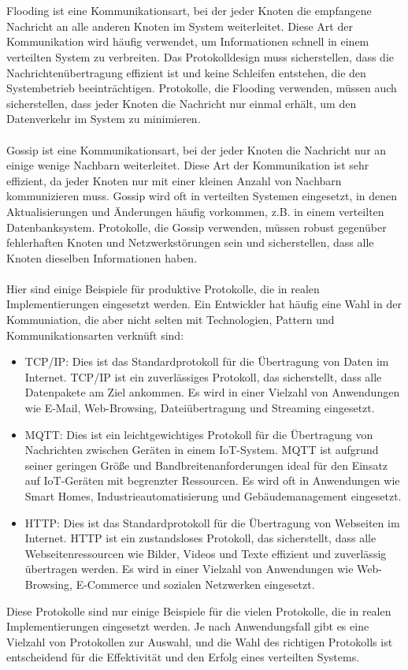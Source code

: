 \\\\
Flooding ist eine Kommunikationsart, bei der jeder Knoten die empfangene Nachricht an alle anderen Knoten im System weiterleitet. Diese Art der Kommunikation wird häufig verwendet, um Informationen schnell in einem verteilten System zu verbreiten. Das Protokolldesign muss sicherstellen, dass die Nachrichtenübertragung effizient ist und keine Schleifen entstehen, die den Systembetrieb beeinträchtigen. Protokolle, die Flooding verwenden, müssen auch sicherstellen, dass jeder Knoten die Nachricht nur einmal erhält, um den Datenverkehr im System zu minimieren.
\\\\
Gossip ist eine Kommunikationsart, bei der jeder Knoten die Nachricht nur an einige wenige Nachbarn weiterleitet. Diese Art der Kommunikation ist sehr effizient, da jeder Knoten nur mit einer kleinen Anzahl von Nachbarn kommunizieren muss. Gossip wird oft in verteilten Systemen eingesetzt, in denen Aktualisierungen und Änderungen häufig vorkommen, z.B. in einem verteilten Datenbanksystem. Protokolle, die Gossip verwenden, müssen robust gegenüber fehlerhaften Knoten und Netzwerkstörungen sein und sicherstellen, dass alle Knoten dieselben Informationen haben.
\\\\
Hier sind einige Beispiele für produktive Protokolle, die in realen Implementierungen eingesetzt werden. Ein Entwickler hat häufig eine Wahl in der Kommuniation, die aber nicht selten mit Technologien, Pattern und Kommunikationsarten verknüft sind:
 \begin{itemize}
\item TCP/IP: Dies ist das Standardprotokoll für die Übertragung von Daten im Internet. TCP/IP ist ein zuverlässiges Protokoll, das sicherstellt, dass alle Datenpakete am Ziel ankommen. Es wird in einer Vielzahl von Anwendungen wie E-Mail, Web-Browsing, Dateiübertragung und Streaming eingesetzt.

\item  MQTT: Dies ist ein leichtgewichtiges Protokoll für die Übertragung von Nachrichten zwischen Geräten in einem IoT-System. MQTT ist aufgrund seiner geringen Größe und Bandbreitenanforderungen ideal für den Einsatz auf IoT-Geräten mit begrenzter Ressourcen. Es wird oft in Anwendungen wie Smart Homes, Industrieautomatisierung und Gebäudemanagement eingesetzt.

\item HTTP: Dies ist das Standardprotokoll für die Übertragung von Webseiten im Internet. HTTP ist ein zustandsloses Protokoll, das sicherstellt, dass alle Webseitenressourcen wie Bilder, Videos und Texte effizient und zuverlässig übertragen werden. Es wird in einer Vielzahl von Anwendungen wie Web-Browsing, E-Commerce und sozialen Netzwerken eingesetzt.
 \end{itemize}
Diese Protokolle sind nur einige Beispiele für die vielen Protokolle, die in realen Implementierungen eingesetzt werden. Je nach Anwendungsfall gibt es eine Vielzahl von Protokollen zur Auswahl, und die Wahl des richtigen Protokolls ist entscheidend für die Effektivität und den Erfolg eines verteilten Systems.

